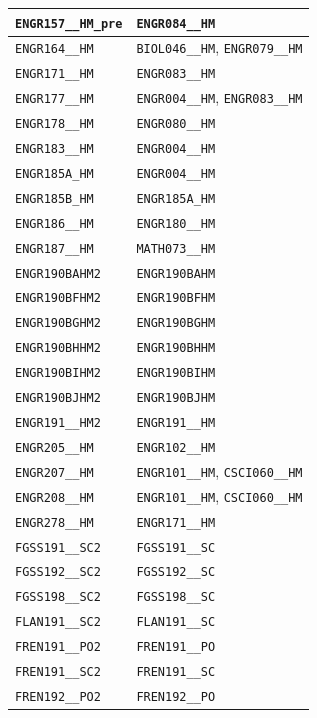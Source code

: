 \begin{longtable}{|p{4.4in}|p{4.4in}|}
    \verb|ENGR157__HM_pre| & \verb|ENGR084__HM|\\\hline
    \verb|ENGR164__HM| & \verb|BIOL046__HM|, \verb|ENGR079__HM|\\\hline
    \verb|ENGR171__HM| & \verb|ENGR083__HM|\\\hline
    \verb|ENGR177__HM| & \verb|ENGR004__HM|, \verb|ENGR083__HM|\\\hline
    \verb|ENGR178__HM| & \verb|ENGR080__HM|\\\hline
    \verb|ENGR183__HM| & \verb|ENGR004__HM|\\\hline
    \verb|ENGR185A_HM| & \verb|ENGR004__HM|\\\hline
    \verb|ENGR185B_HM| & \verb|ENGR185A_HM|\\\hline
    \verb|ENGR186__HM| & \verb|ENGR180__HM|\\\hline
    \verb|ENGR187__HM| & \verb|MATH073__HM|\\\hline
    \verb|ENGR190BAHM2| & \verb|ENGR190BAHM|\\\hline
    \verb|ENGR190BFHM2| & \verb|ENGR190BFHM|\\\hline
    \verb|ENGR190BGHM2| & \verb|ENGR190BGHM|\\\hline
    \verb|ENGR190BHHM2| & \verb|ENGR190BHHM|\\\hline
    \verb|ENGR190BIHM2| & \verb|ENGR190BIHM|\\\hline
    \verb|ENGR190BJHM2| & \verb|ENGR190BJHM|\\\hline
    \verb|ENGR191__HM2| & \verb|ENGR191__HM|\\\hline
    \verb|ENGR205__HM| & \verb|ENGR102__HM|\\\hline
    \verb|ENGR207__HM| & \verb|ENGR101__HM|, \verb|CSCI060__HM|\\\hline
    \verb|ENGR208__HM| & \verb|ENGR101__HM|, \verb|CSCI060__HM|\\\hline
    \verb|ENGR278__HM| & \verb|ENGR171__HM|\\\hline
    \verb|FGSS191__SC2| & \verb|FGSS191__SC|\\\hline
    \verb|FGSS192__SC2| & \verb|FGSS192__SC|\\\hline
    \verb|FGSS198__SC2| & \verb|FGSS198__SC|\\\hline
    \verb|FLAN191__SC2| & \verb|FLAN191__SC|\\\hline
    \verb|FREN191__PO2| & \verb|FREN191__PO|\\\hline
    \verb|FREN191__SC2| & \verb|FREN191__SC|\\\hline
    \verb|FREN192__PO2| & \verb|FREN192__PO|\\\hline

\end{longtable}

